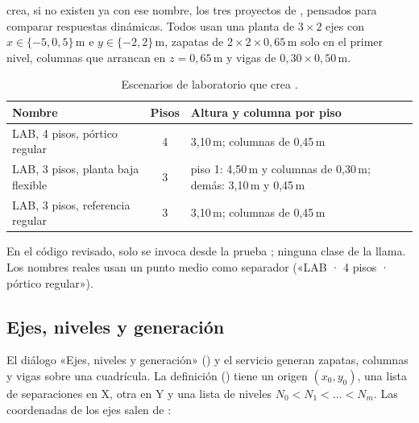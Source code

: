  crea, si no existen ya con ese nombre, los tres proyectos de
, pensados para comparar respuestas dinámicas. Todos usan una planta de $3 \times 2$ ejes
con $x \in \{-5, 0, 5\}$\,m e $y \in \{-2, 2\}$\,m, zapatas de $2 \times 2 \times 0{,}65$\,m solo en el primer nivel,
columnas que arrancan en $z = 0{,}65$\,m y vigas de $0{,}30 \times 0{,}50$\,m.

\begin{table}[H]
	\centering
	\caption{Escenarios de laboratorio que crea .}
	\label{tab:mod-escenarios}
	\begin{tabular}{L{5.2cm}cL{6.6cm}}
		\hline
		\textbf{Nombre} & \textbf{Pisos} & \textbf{Altura y columna por piso} \\ \hline
		LAB, 4 pisos, pórtico regular & 4 & 3,10\,m; columnas de 0,45\,m \\
		LAB, 3 pisos, planta baja flexible & 3 & piso 1: 4,50\,m y columnas de 0,30\,m; demás: 3,10\,m y 0,45\,m \\
		LAB, 3 pisos, referencia regular & 3 & 3,10\,m; columnas de 0,45\,m \\
		\hline
	\end{tabular}
\end{table}

\begin{nota}
	En el código revisado,  solo se invoca desde la prueba
	; ninguna clase de  la llama. Los nombres reales usan un punto medio
	como separador («LAB · 4 pisos · pórtico regular»).
\end{nota}

\subsection{Ejes, niveles y generación}
\label{sec:mod-cuadricula}

El diálogo «Ejes, niveles y generación» () y el servicio 
generan zapatas, columnas y vigas sobre una cuadrícula. La definición () tiene un origen
$(x_0, y_0)$, una lista de separaciones en X, otra en Y y una lista de niveles $N_0 < N_1 < \dots < N_m$. Las
coordenadas de los ejes salen de :

